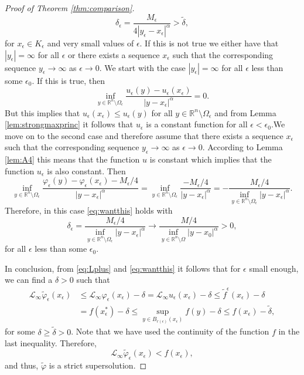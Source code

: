\documentclass[10pt,a4paper]{amsart}
\providecommand{\Linf}{\mathcal{L}_{\infty}}
\providecommand{\Rn}{\mathbb{R}^n}
\begin{document}
\begin{proof}[Proof of Theorem \ref{thm:comparison}]
\begin{equation}
\label{eq:delta_bound}
    \delta_{\epsilon} = \frac{M_{\epsilon}}{4|y_{\epsilon}-x_{\epsilon}|^{\alpha}} > \tilde{\delta},
\end{equation}
for $x_{\epsilon} \in K_{\epsilon}$ and very small values of $\epsilon$. If this is not true we either have that $|y_{\epsilon}|=\infty$ for all $\epsilon$ or there exists a sequence $x_{\epsilon}$ such that the corresponding sequence $y_{\epsilon} \to \infty$ as $\epsilon \to 0$. We start with the case $|y_{\epsilon}|=\infty$ for all $\epsilon$ less than some $\epsilon_0$. If this is true, then
$$
 \inf_{y \in \Rn \setminus \Omega_{\epsilon}} \frac{u_{\epsilon}(y)-u_{\epsilon}(x_{\epsilon})}{|y-x_{\epsilon}|^{\alpha}} =0.
$$
But this implies that $u_{\epsilon}(x_{\epsilon}) \leq u_{\epsilon}(y)$ for all $y \in \Rn \setminus \Omega_{\epsilon}$ and from Lemma \ref{lem:strongmaxprinc} it follows that $u_{\epsilon}$ is a constant function for all $\epsilon < \epsilon_0$.We move on to the second case and therefore assume that there exists a sequence $x_{\epsilon}$ such that the corresponding sequence $y_{\epsilon} \to \infty$ as $\epsilon \to 0$. According to Lemma \ref{lem:A4} this means that the function $u$ is constant which implies that the function $u_{\epsilon}$ is also constant. Then
\begin{equation*}
\inf_{y \in \Rn \setminus \Omega_{\epsilon}} \frac{\varphi_{\epsilon}(y) - \varphi_{\epsilon}(x_{\epsilon})-M_{\epsilon}/4}{|y-x_{\epsilon}|^{\alpha}} = \inf_{y \in \Rn \setminus \Omega_{\epsilon}} \frac{-M_{\epsilon}/4}{|y-x_{\epsilon}|^{\alpha}} = -\frac{M_{\epsilon}/4}{\inf_{y \in \Rn \setminus \Omega_{\epsilon}} |y-x_{\epsilon}|^{\alpha}}.
\end{equation*}
Therefore, in this case \eqref{eq:wantthis} holds with
$$
\delta_{\epsilon} = \frac{M_{\epsilon}/4}{\inf_{y \in \Rn \setminus \Omega_{\epsilon}} |y-x_{\epsilon}|^{\alpha}} \to  \frac{M/4}{\inf_{y \in \Rn \setminus \Omega} |y-x_0|^{\alpha}} >0,
$$
for all $\epsilon$ less than some $\epsilon_0$.

In conclusion, from \eqref{eq:Lplus} and \eqref{eq:wantthis} it follows that for $\epsilon$ small enough, we can find a $\delta > 0$ such that
\begin{align*}
    \Linf \tilde{\varphi}_{\epsilon}(x_{\epsilon}) &\leq \Linf \varphi_{\epsilon}(x_{\epsilon})- \delta  =\Linf u_{\epsilon}(x_{\epsilon}) - \delta  \label{eq:rhs_cont}
     \leq  \tilde{f}^{\epsilon}(x_{\epsilon})-\delta  \\
    & =f(x_{\epsilon}^*) -\delta  \leq \sup_{y \in B_{r(\epsilon)}(x_{\epsilon})} f(y)-\delta \leq f(x_{\epsilon})-\tilde{\delta}, \nonumber
\end{align*}
for some $\delta \geq \tilde{\delta}>0$. Note that we have used the continuity of the function $f$ in the last inequality. Therefore,
\begin{equation}\label{eq:contradiction3}
   \Linf \tilde{\varphi}_{\epsilon}(x_{\epsilon}) < f(x_{\epsilon}), 
\end{equation}
and thus, $\tilde{\varphi}$ is a strict supersolution.


\end{proof}
\end{document}
